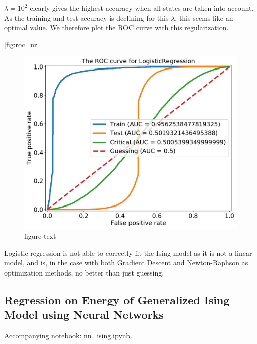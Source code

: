 $\lambda = 10^2$ clearly gives the highest accuracy when all states are taken into account. As the training and test accuracy is declining for this $\lambda$, this seems like an optimal value. We therefore plot the ROC curve with this regularization.

\autoref{fig:roc_nr}

\begin{figure}[H]
\begin{center}\includegraphics[scale=0.5]{latex/figures/logistic_roc_curve_nr.pdf}
\end{center}
\caption{figure text}
\label{fig:roc_nr}
\end{figure}

Logistic regression is not able to correctly fit the Ising model as it is not a linear model, and is, in the case with both Gradient Descent and Newton-Raphson as optimization methods, no better than just guessing.





\subsection{Regression on Energy of Generalized Ising Model using Neural Networks}\label{sec:results NN reg}
Accompanying notebook: \href{https://github.com/nicolossus/FYS-STK4155-Project2/blob/master/notebooks/nn_ising.ipynb}{nn\_ising.ipynb}.

